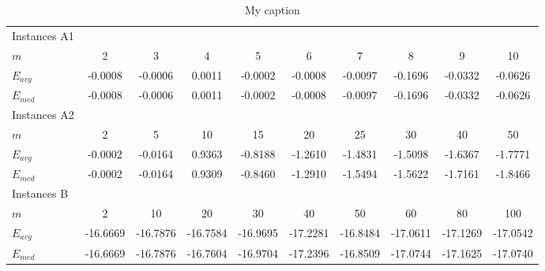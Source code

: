 \begin{table}[]
\scriptsize
\centering
\begin{tabular}{lccccccccc}
\hline
Instances A1 &          &          &          &          &          &          &          &          &          \\
$m$                   & 2        & 3        & 4        & 5        & 6        & 7        & 8        & 9        & 10       \\
$E_{avg}$             & -0.0008  & -0.0006  & 0.0011   & -0.0002  & -0.0008  & -0.0097  & -0.1696  & -0.0332  & -0.0626  \\
$E_{med}$             & -0.0008  & -0.0006  & 0.0011   & -0.0002  & -0.0008  & -0.0097  & -0.1696  & -0.0332  & -0.0626  \\ \hline
Instances A2 &          &          &          &          &          &          &          &          &          \\
$m$                   & 2        & 5        & 10       & 15       & 20       & 25       & 30       & 40       & 50       \\
$E_{avg}$             & -0.0002  & -0.0164  & 0.9363   & -0.8188  & -1.2610  & -1.4831  & -1.5098  & -1.6367  & -1.7771  \\
$E_{med}$             & -0.0002  & -0.0164  & 0.9309   & -0.8460  & -1.2910  & -1.5494  & -1.5622  & -1.7161  & -1.8466  \\ \hline
Instances B &          &          &          &          &          &          &          &          &          \\
$m$                   & 2        & 10       & 20       & 30       & 40       & 50       & 60       & 80       & 100      \\
$E_{avg}$             & -16.6669 & -16.7876 & -16.7584 & -16.9695 & -17.2281 & -16.8484 & -17.0611 & -17.1269 & -17.0542 \\
$E_{med}$             & -16.6669 & -16.7876 & -16.7604 & -16.9704 & -17.2396 & -16.8509 & -17.0744 & -17.1625 & -17.0740 \\ \hline
\end{tabular}
\caption{My caption}
\label{my-label}
\end{table}